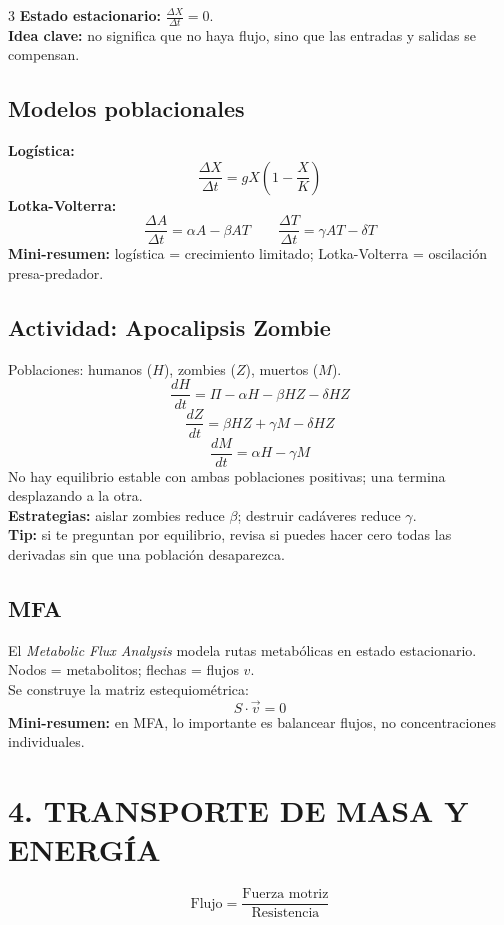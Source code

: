 \documentclass[9pt,landscape,letterpaper]{extarticle}
\begin{document}
\begin{multicols*}{3}
	\textbf{Estado estacionario:} $\frac{\Delta X}{\Delta t}=0$.\\
	\textbf{Idea clave:} no significa que no haya flujo, sino que las entradas y salidas se compensan.

	\subsection{Modelos poblacionales}
	\textbf{Logística:}
	\[
		\frac{\Delta X}{\Delta t}=gX\left(1-\frac{X}{K}\right)
	\]
	\textbf{Lotka-Volterra:}
	\[
		\frac{\Delta A}{\Delta t}=\alpha A-\beta AT
		\qquad
		\frac{\Delta T}{\Delta t}=\gamma AT-\delta T
	\]
	\textbf{Mini-resumen:} logística = crecimiento limitado; Lotka-Volterra = oscilación presa-predador.

	\subsection{Actividad: Apocalipsis Zombie}
	Poblaciones: humanos ($H$), zombies ($Z$), muertos ($M$).\\
	\[
		\frac{dH}{dt}=\Pi-\alpha H-\beta HZ-\delta HZ
	\]
	\[
		\frac{dZ}{dt}=\beta HZ+\gamma M-\delta HZ
	\]
	\[
		\frac{dM}{dt}=\alpha H-\gamma M
	\]
	No hay equilibrio estable con ambas poblaciones positivas; una termina desplazando a la otra.\\
	\textbf{Estrategias:} aislar zombies reduce $\beta$; destruir cadáveres reduce $\gamma$.\\
	\textbf{Tip:} si te preguntan por equilibrio, revisa si puedes hacer cero todas las derivadas sin que una población desaparezca.

	\subsection{MFA}
	El \textit{Metabolic Flux Analysis} modela rutas metabólicas en estado estacionario.\\
	Nodos = metabolitos; flechas = flujos $v$.\\
	Se construye la matriz estequiométrica:
	\[
		S\cdot \vec{v}=0
	\]
	\textbf{Mini-resumen:} en MFA, lo importante es balancear flujos, no concentraciones individuales.

	\section{4. TRANSPORTE DE MASA Y ENERGÍA}
	\begin{tcolorbox}[colback=boxbg,colframe=myblue,boxrule=0.5pt,arc=2pt]
		\[
			\text{Flujo}=\frac{\text{Fuerza motriz}}{\text{Resistencia}}
		\]
	\end{tcolorbox}


\end{multicols*}
\end{document}
